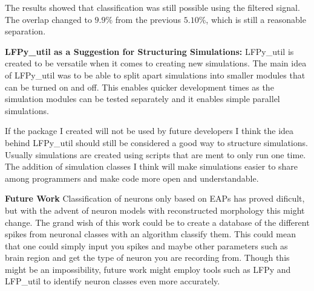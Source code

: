 \documentclass[altfont, fleqn]{uiophd}
\begin{document}
The results showed that classification was still possible using
the filtered signal. 
The overlap changed to 
$9.9\%$ from the previous
$5.10\%$, which
is still a reasonable separation. 
\newline

\noindent
{\bf LFPy\_util as a Suggestion for Structuring Simulations:}
LFPy\_util is created to be versatile when it comes to creating new simulations. 
The main idea of LFPy\_util was to be able to split apart simulations 
into smaller modules that can be turned on and off. 
This enables quicker development times as the simulation modules
can be tested separately and it enables simple parallel simulations.

If the package I created will not be used by future developers 
I think the idea behind LFPy\_util should still be considered a
good way to structure simulations.
Usually simulations are created using scripts that are ment to 
only run one time. 
The addition of simulation classes I think will make
simulations easier to share among programmers and make code more open and
understandable. 
\newline

\noindent
{\bf Future Work}
Classification of neurons only based 
on EAPs
has proved dificult, but with the advent of
neuron models with reconstructed morphology 
this might change. 
The grand wish of this work could be to create a
database of the different spikes from neuronal classes
with an algorithm classify them.
This could mean that one could simply input you spikes
and maybe other parameters such as brain region 
and get the type of neuron you are recording from. 
Though this might be an impossibility, 
future work might employ tools such as LFPy and LFP\_util
to identify neuron classes even more accurately. 






\end{document}
